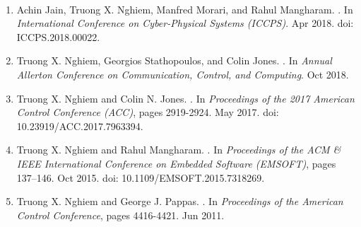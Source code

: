 \documentclass[11pt]{article}
\begin{document}
 ~

\begin{enumerate}
  
  \providecommand{\natexlab}[1]{#1}
  \providecommand{\url}[1]{\texttt{#1}}
  \expandafter\ifx\csname urlstyle\endcsname\relax
  \providecommand{\doi}[1]{doi: #1}\else
  \providecommand{\doi}{doi: \begingroup \urlstyle{rm}\Url}\fi

\item Achin Jain, Truong X. Nghiem, Manfred Morari, and Rahul Mangharam.
  .
  \newblock In \emph{International {{Conference}} on {{Cyber}}-{{Physical Systems}} ({{ICCPS}})}.  Apr 2018.
  \newblock \doi{ICCPS.2018.00022}.

\item Truong X. Nghiem, Georgios Stathopoulos, and Colin Jones.
  .
  \newblock In \emph{Annual {{Allerton Conference}} on {{Communication}}, {{Control}}, and {{Computing}}}.
  Oct 2018.

\item Truong X. Nghiem and Colin N. Jones.
  .
  \newblock In \emph{Proceedings of the 2017 {{American Control Conference}} ({{ACC}})}, pages 2919-2924.  May 2017.
  \newblock \doi{10.23919/ACC.2017.7963394}.
  
\item Truong X. Nghiem and Rahul Mangharam.
  .
  \newblock In \emph{Proceedings of the {{ACM}} \& {{IEEE International}} Conference on {{Embedded}} Software ({{EMSOFT}})}, pages 137--146.   Oct 2015.
  \newblock \doi{10.1109/EMSOFT.2015.7318269}.

\item Truong X. Nghiem and George J. Pappas.
  .
  \newblock In \emph{Proceedings of the {{American Control Conference}}}, pages 4416-4421.  Jun 2011.

\end{enumerate}

\end{document}
